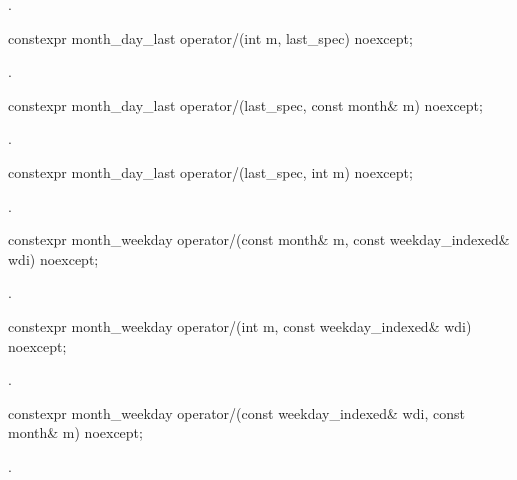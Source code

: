\begin{itemdescr}
\pnum
\returns
{}.
\end{itemdescr}

\begin{itemdecl}
constexpr month_day_last
  operator/(int m, last_spec) noexcept;
\end{itemdecl}

\begin{itemdescr}
\pnum
\returns
{}.
\end{itemdescr}

\begin{itemdecl}
constexpr month_day_last
  operator/(last_spec, const month& m) noexcept;
\end{itemdecl}

\begin{itemdescr}
\pnum
\returns
{}.
\end{itemdescr}

\begin{itemdecl}
constexpr month_day_last
  operator/(last_spec, int m) noexcept;
\end{itemdecl}

\begin{itemdescr}
\pnum
\returns
{}.
\end{itemdescr}

\begin{itemdecl}
constexpr month_weekday
  operator/(const month& m, const weekday_indexed& wdi) noexcept;
\end{itemdecl}

\begin{itemdescr}
\pnum
\returns
{}.
\end{itemdescr}

\begin{itemdecl}
constexpr month_weekday
  operator/(int m, const weekday_indexed& wdi) noexcept;
\end{itemdecl}

\begin{itemdescr}
\pnum
\returns
{}.
\end{itemdescr}

\begin{itemdecl}
constexpr month_weekday
  operator/(const weekday_indexed& wdi, const month& m) noexcept;
\end{itemdecl}

\begin{itemdescr}
\pnum
\returns
{}.
\end{itemdescr}


